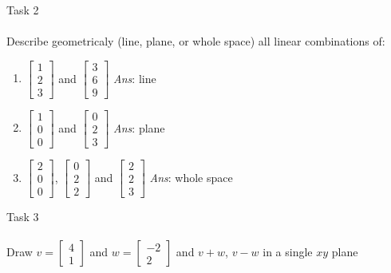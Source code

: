 \documentclass[aspectratio=169]{beamer}
\begin{document}
\begin{frame}[t]{Task 2}
\framesubtitle{}
    Describe geometricaly (line, plane, or whole space) all linear combinations of:
        \begin{enumerate}
            \item $\begin{bmatrix}1 \\ 2 \\3 \end{bmatrix}$ and $\begin{bmatrix}3 \\ 6 \\9 \end{bmatrix}$  {\alert{\textit{Ans}: line}}
            \item $\begin{bmatrix}1 \\ 0 \\0 \end{bmatrix}$ and $\begin{bmatrix}0 \\ 2 \\3 \end{bmatrix}$  {\alert{\textit{Ans}: plane}}
            \item $\begin{bmatrix}2 \\ 0 \\0 \end{bmatrix}$, $\begin{bmatrix}0 \\ 2 \\2 \end{bmatrix}$ and $\begin{bmatrix}2 \\ 2 \\3 \end{bmatrix}$  {\alert{\textit{Ans}: whole space}}
        \end{enumerate}
\end{frame}

\begin{frame}[c]{Task 3}
\framesubtitle{}\centering\large
    Draw $v = \begin{bmatrix}4 \\1 \end{bmatrix}$ and $w = \begin{bmatrix}-2 \\ 2 \end{bmatrix}$ and $ v + w $, $v-w$ in a single $xy$ plane
\end{frame}
\end{document}
